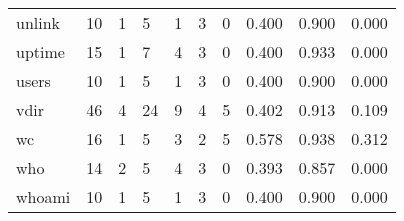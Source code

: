 \begin{longtable}{lp{2.0cm}p{2.0cm}p{2.0cm}p{2.0cm}p{2.0cm}p{2.0cm}p{2.0cm}p{2.0cm}p{2.0cm}}
unlink    &                     10 &                                             1 &                                            5 &                                           1 &                                            3 &                                          0 &                                0.400 &                                  0.900 &                                0.000 \\
uptime    &                     15 &                                             1 &                                            7 &                                           4 &                                            3 &                                          0 &                                0.400 &                                  0.933 &                                0.000 \\
users     &                     10 &                                             1 &                                            5 &                                           1 &                                            3 &                                          0 &                                0.400 &                                  0.900 &                                0.000 \\
vdir      &                     46 &                                             4 &                                           24 &                                           9 &                                            4 &                                          5 &                                0.402 &                                  0.913 &                                0.109 \\
wc        &                     16 &                                             1 &                                            5 &                                           3 &                                            2 &                                          5 &                                0.578 &                                  0.938 &                                0.312 \\
who       &                     14 &                                             2 &                                            5 &                                           4 &                                            3 &                                          0 &                                0.393 &                                  0.857 &                                0.000 \\
whoami    &                     10 &                                             1 &                                            5 &                                           1 &                                            3 &                                          0 &                                0.400 &                                  0.900 &                                0.000 \\

\end{longtable}
